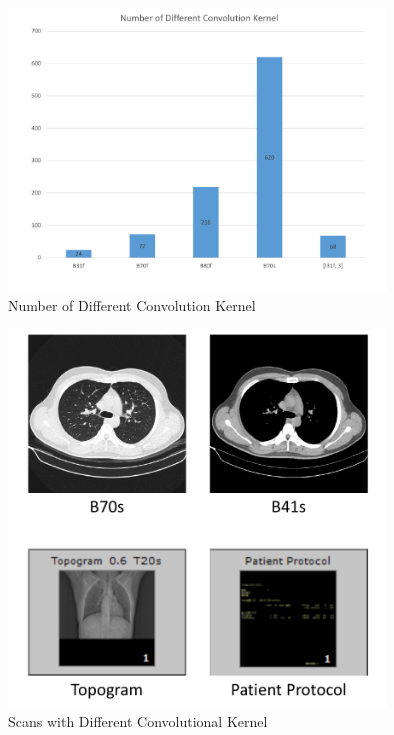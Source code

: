 \documentclass[runningheads]{llncs}
\begin{document}
\begin{figure}[t]
\centerline{\includegraphics[width=100mm]{NumberofDifferentConvolutionKernel.pdf}}
\vspace{-0cm}
\caption{Number of Different Convolution Kernel}
\vspace{-0cm}
\label{NumberofDifferentConvolutionKernel}
\end{figure}

\begin{figure}[t]
    \centerline{\includegraphics[width=100mm]{Bs.pdf}}
    \vspace{-0cm}
    \caption{Scans with Different Convolutional Kernel}
    \vspace{-0cm}
    \label{Bs}
    \end{figure}
\end{document}
